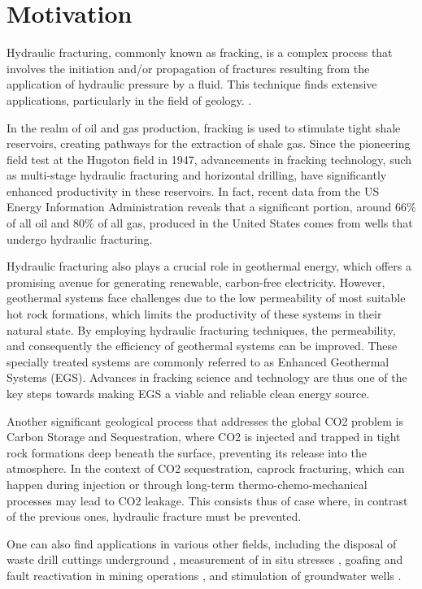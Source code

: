 \section{Motivation}

Hydraulic fracturing, commonly known as fracking, is a complex process that involves the initiation and/or propagation of fractures resulting from the application of hydraulic pressure by a fluid. This technique finds extensive applications, particularly in the field of geology. \cite{adachi2007computer}.

In the realm of oil and gas production, fracking is used to stimulate tight shale reservoirs, creating pathways for the extraction of shale gas. Since the pioneering field test at the Hugoton field in 1947, advancements in fracking technology, such as multi-stage hydraulic fracturing and horizontal drilling, have significantly enhanced productivity in these reservoirs. In fact, recent data from the US Energy Information Administration\cite{eia_data_on_gas, eia_data_on_oil} reveals that a significant portion, around 66\% of all oil and 80\% of all gas, produced in the United States comes from wells that undergo hydraulic fracturing.

Hydraulic fracturing also plays a crucial role in geothermal energy, which offers a promising avenue for generating renewable, carbon-free electricity. However, geothermal systems face challenges due to the low permeability of most suitable hot rock formations, which limits the productivity of these systems in their natural state. By employing hydraulic fracturing techniques, the permeability, and consequently the efficiency of geothermal systems can be improved. These specially treated systems are commonly referred to as Enhanced Geothermal Systems (EGS). Advances in fracking science and technology are thus one of the key steps towards making EGS a viable and reliable clean energy source.

Another significant geological process that addresses the global CO2 problem is Carbon Storage and Sequestration, where CO2 is injected and trapped in tight rock formations deep beneath the surface, preventing its release into the atmosphere. In the context of CO2 sequestration, caprock fracturing, which can happen during injection or through long-term thermo-chemo-mechanical processes may lead to CO2 leakage.\cite{pan2014tough} This consists thus of case where, in contrast of the previous ones, hydraulic fracture must be prevented. 

One can also find applications in various other fields, including the disposal of waste drill cuttings underground \cite{moschovidis_mounds_2000}, measurement of in situ stresses \cite{desroches_stress_1995, desroches1993modelling}, goafing and fault reactivation in mining operations \cite{board_fluid_1992, zhang_propagation_2002}, and stimulation of groundwater wells \cite{noauthor_permeability_nodate,less_hydrofracture_1994}.

